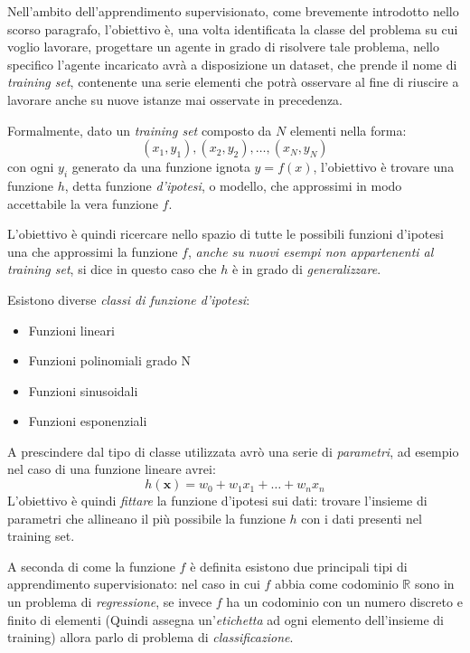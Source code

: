 \documentclass[../../main.tex]{subfiles}
\begin{document}
    Nell'ambito dell'apprendimento supervisionato, come brevemente introdotto nello scorso paragrafo, l'obiettivo è, una volta identificata la classe del problema su cui voglio lavorare, progettare un agente in grado di risolvere tale problema, nello specifico l'agente incaricato avrà a disposizione un dataset, che prende il nome di \textit{training set}, contenente una serie elementi che potrà osservare al fine di riuscire a lavorare anche su nuove istanze mai osservate in precedenza.

    Formalmente, dato un \textit{training set} composto da $N$ elementi nella forma:
    \[(x_1, y_1), (x_2, y_2), \dots, (x_N, y_N)\]
    con ogni $y_i$ generato da una funzione ignota $y = f(x)$, l'obiettivo è trovare una funzione $h$, detta funzione \textit{d'ipotesi}, o modello, che approssimi in modo accettabile la vera funzione $f$.

    L'obiettivo è quindi ricercare nello spazio di tutte le possibili funzioni d'ipotesi una che approssimi la funzione $f$, \textit{anche su nuovi esempi non appartenenti al training set}, si dice in questo caso che $h$ è in grado di \textit{generalizzare}.

    Esistono diverse \textit{classi di funzione d'ipotesi}:
    \begin{itemize}
        \item Funzioni lineari
        \item Funzioni polinomiali grado N
        \item Funzioni sinusoidali
        \item Funzioni esponenziali
    \end{itemize}

    A prescindere dal tipo di classe utilizzata avrò una serie di \textit{parametri}, ad esempio nel caso di una funzione lineare avrei:
    \[h(\boldsymbol{x}) = w_0 + w_1x_1 + \dots + w_nx_n\]
    L'obiettivo è quindi \textit{fittare} la funzione d'ipotesi sui dati: trovare l'insieme di parametri che allineano il più possibile la funzione $h$ con i dati presenti nel training set. 

    A seconda di come la funzione $f$ è definita esistono due principali tipi di apprendimento supervisionato: nel caso in cui $f$ abbia come codominio $\mathbb{R}$ sono in un problema di \textit{regressione}, se invece $f$ ha un codominio con un numero discreto e finito di elementi (Quindi assegna un'\textit{etichetta} ad ogni elemento dell'insieme di training) allora parlo di problema di \textit{classificazione}.
\end{document}
